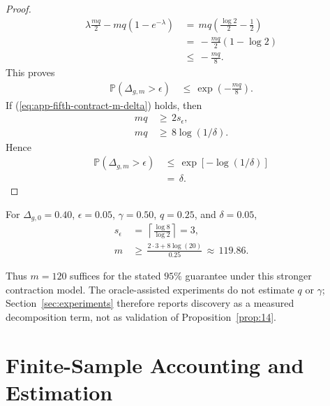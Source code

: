 \documentclass{article} %
\renewcommand{\eqref}[1]{\textup{(\ref{#1})}}
\begin{document}
\begin{proof}
\begin{equation}
\begin{aligned}
\lambda\frac{mq}{2}
-
mq(1-e^{-\lambda})
&\,=\,
mq\left(
\frac{\log 2}{2}
-
\frac{1}{2}
\right)
\\
&\,=\,
-\frac{mq}{2}(1-\log 2)
\\
&\,\le\,
-\frac{mq}{8}.
\end{aligned}
\end{equation}
This proves
\begin{equation}
\label{eq:app-fifth-contract-proof-final-tail}
\begin{aligned}
\mathbb{P}(\Delta_{g,m}>\epsilon)
&\,\le\,
\exp\!\left(-\frac{mq}{8}\right).
\end{aligned}
\end{equation}
If \eqref{eq:app-fifth-contract-m-delta} holds, then
\begin{equation}
\label{eq:app-fifth-contract-proof-delta-conditions}
\begin{aligned}
mq
&\,\ge\,
2s_\epsilon,
\\
mq
&\,\ge\,
8\log(1/\delta).
\end{aligned}
\end{equation}
Hence
\begin{equation}
\label{eq:app-fifth-contract-proof-delta}
\begin{aligned}
\mathbb{P}(\Delta_{g,m}>\epsilon)
&\,\le\,
\exp[-\log(1/\delta)]
\\
&\,=\,
\delta.
\end{aligned}
\end{equation}
\end{proof}

For \(\Delta_{g,0}=0.40\), \(\epsilon=0.05\), \(\gamma=0.50\),
\(q=0.25\), and \(\delta=0.05\),
\begin{align}
\label{eq:app-fifth-contract-example-s}
s_\epsilon
&\,=\,
\left\lceil\frac{\log8}{\log2}\right\rceil=3,
\\
\label{eq:app-fifth-contract-example-m}
m
&\,\ge\,
\frac{2\cdot 3+8\log(20)}{0.25}
\,\approx\,119.86.
\end{align}

Thus \(m=120\) suffices for the stated \(95\%\) guarantee under this stronger
contraction model. The oracle-assisted experiments do not estimate \(q\) or
\(\gamma\); Section~\ref{sec:experiments} therefore reports discovery as a
measured decomposition term, not as validation of Proposition~\ref{prop:14}.

\section{Finite-Sample Accounting and Estimation}
\end{document}
